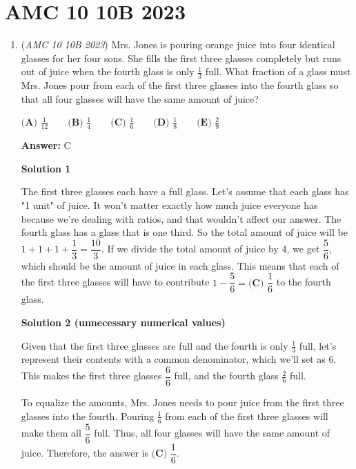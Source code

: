 \section{AMC 10 10B 2023}
        \begin{enumerate}
        	\item (\textit{AMC 10 10B 2023}) Mrs. Jones is pouring orange juice into four identical glasses for her four sons. She fills the first three glasses completely but runs out of juice when the fourth glass is only $\frac{1}{3}$ full. What fraction of a glass must Mrs. Jones pour from each of the first three glasses into the fourth glass so that all four glasses will have the same amount of juice?


 $\textbf{(A) }\frac{1}{12}\qquad\textbf{(B) }\frac{1}{4}\qquad\textbf{(C) }\frac{1}{6}\qquad\textbf{(D) }\frac{1}{8}\qquad\textbf{(E) }\frac{2}{9}$

 \textbf{Answer: }C



\textbf{Solution 1}

The first three glasses each have a full glass.  Let's assume that each glass has "1 unit" of juice. It won't matter exactly how much juice everyone has because we're dealing with ratios, and that wouldn't affect our answer. The fourth glass has a glass that is one third. So the total amount of juice will be $1+1+1+\dfrac{1}{3} = \dfrac{10}{3}$. If we divide the total amount of juice by 4, we get $\dfrac{5}{6}$, which should be the amount of juice in each glass. This means that each of the first three glasses will have to contribute $1 - \dfrac{5}{6} = \boxed{\textbf{(C) }\dfrac16}$ to the fourth glass.

 



\textbf{Solution 2 (unnecessary numerical values)}

Given that the first three glasses are full and the fourth is only $\frac{1}{3}$ full, let's represent their contents with a common denominator, which we'll set as 6. This makes the first three glasses $\dfrac{6}{6}$ full, and the fourth glass $\frac{2}{6}$ full.

 To equalize the amounts, Mrs. Jones needs to pour juice from the first three glasses into the fourth. Pouring $\frac{1}{6}$ from each of the first three glasses will make them all $\dfrac{5}{6}$ full. Thus, all four glasses will have the same amount of juice. Therefore, the answer is $\boxed{\textbf{(C) }\dfrac16}.$





\end{enumerate}
